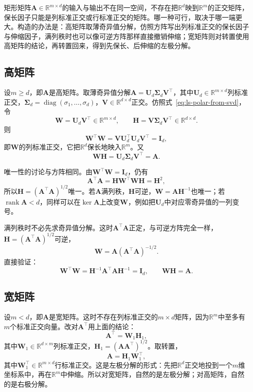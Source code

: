矩形矩阵$\bm A\in\mathbb R^{m\times d}$的输入与输出不在同一空间，不存在把$\mathbb R^d$映到$\mathbb R^m$的正交矩阵，保长因子只能是列标准正交或行标准正交的矩阵。哪一种可行，取决于哪一端更大。构造的办法是：高矩阵取薄奇异值分解，仿照方阵写出列标准正交的保长因子与伸缩因子，满列秩时也可以像可逆方阵那样直接撤销伸缩；宽矩阵则对转置使用高矩阵的结论，再转置回来，得到先保长、后伸缩的左极分解。

\subsection{高矩阵}
\label{sec:ls-polar-tall}

设$m\geq d$，即$\bm A$是高矩阵。取薄奇异值分解$\bm A=\bm U_d\bm\Sigma_d\bm V^\top$，其中$\bm U_d\in\mathbb R^{m\times d}$列标准正交，$\bm\Sigma_d=\operatorname{diag}(\sigma_1,\ldots,\sigma_d)$，$\bm V\in\mathbb R^{d\times d}$正交。仿照式~\eqref{eq:ls-polar-from-svd}，令
\[
 \bm W=\bm U_d\bm V^\top\in\mathbb R^{m\times d},\qquad
 \bm H=\bm V\bm\Sigma_d\bm V^\top\in\mathbb R^{d\times d}.
\]
则
\[
 \bm W^\top\bm W=\bm V\bm U_d^\top\bm U_d\bm V^\top=\bm I_d ,
\]
即$\bm W$的列标准正交，它把$\mathbb R^d$保长地映入$\mathbb R^m$。又
\[
 \bm W\bm H=\bm U_d\bm\Sigma_d\bm V^\top=\bm A .
\]

唯一性的讨论与方阵相同。由$\bm W^\top\bm W=\bm I_d$，仍有
\[
 \bm A^\top\bm A=\bm H\bm W^\top\bm W\bm H=\bm H^2 ,
\]
所以$\bm H=(\bm A^\top\bm A)^{1/2}$唯一。若$\bm A$满列秩，$\bm H$可逆，$\bm W=\bm A\bm H^{-1}$也唯一；若$\operatorname{rank}\bm A<d$，同样可以在$\ker\bm A$上改变$\bm W$，例如把$\bm U_d$中对应零奇异值的一列变号。

满列秩时不必先求奇异值分解。这时$\bm A^\top\bm A$正定，与可逆方阵完全一样，$\bm H=(\bm A^\top\bm A)^{1/2}$可逆，
\[
 \bm W=\bm A(\bm A^\top\bm A)^{-1/2}.
\]
直接验证：
\[
 \bm W^\top\bm W=\bm H^{-1}\bm A^\top\bm A\bm H^{-1}=\bm I_d,\qquad\bm W\bm H=\bm A .
\]

\subsection{宽矩阵}
\label{sec:ls-polar-wide}

设$m<d$，即$\bm A$是宽矩阵。这时不存在列标准正交的$m\times d$矩阵，因为$\mathbb R^m$中至多有$m$个标准正交向量。改对$\bm A^\top$用上面的结论：
\[
 \bm A^\top=\bm W_1\bm H_1 ,
\]
其中$\bm W_1\in\mathbb R^{d\times m}$列标准正交，$\bm H_1=(\bm A\bm A^\top)^{1/2}$。取转置，
\[
 \bm A=\bm H_1\bm W_1^\top ,
\]
其中$\bm W_1^\top\in\mathbb R^{m\times d}$行标准正交。这是左极分解的形式：先把$\mathbb R^d$正交地投到一个$m$维坐标系中，再在$\mathbb R^m$中伸缩。所以对宽矩阵，自然的是左极分解；对高矩阵，自然的是右极分解。

